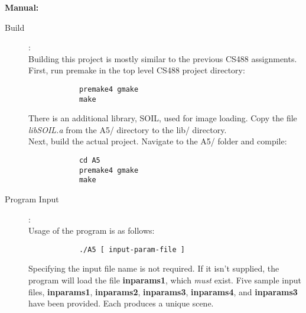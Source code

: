 \documentclass{article}
\begin{document}
\Large\noindent\textbf{Manual:}
\normalsize
	\begin{description}
	\item[Build]:\\
		Building this project is mostly similar to the previous CS488 assignments. First, run premake in the top level CS488 project directory:
		\begin{verbatim}
			premake4 gmake
			make
		\end{verbatim}
		There is an additional library, SOIL, used for image loading. Copy the file \textit{libSOIL.a} from the A5/ directory to the lib/ directory. \\
		Next, build the actual project. Navigate to the A5/ folder and compile:
		\begin{verbatim}
			cd A5
			premake4 gmake
			make
		\end{verbatim}

	\item[Program Input]:\\
		Usage of the program is as follows:
		\begin{verbatim}
			./A5 [ input-param-file ]
		\end{verbatim}
		Specifying the input file name is not required. If it isn't supplied, the program will load the file \textbf{inparams1}, which \textit{must} exist. Five sample input files, \textbf{inparams1}, \textbf{inparams2}, \textbf{inparams3}, \textbf{inparams4}, and \textbf{inparams3} have been provided. Each produces a unique scene.


\end{description}
\end{document}

